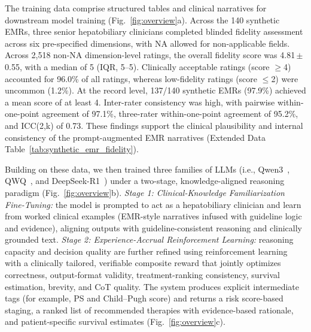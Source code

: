 \documentclass{article}
\begin{document}
The training data comprise structured tables and clinical narratives for downstream model training (Fig.~\ref{fig:overview}a). Across the 140 synthetic EMRs, three senior hepatobiliary clinicians completed blinded fidelity assessment across six pre-specified dimensions, with NA allowed for non-applicable fields. Across 2,518 non-NA dimension-level ratings, the overall fidelity score was 4.81\,$\pm$\,0.55, with a median of 5 (IQR, 5--5). Clinically acceptable ratings (score $\geq$4) accounted for 96.0\% of all ratings, whereas low-fidelity ratings (score $\leq$2) were uncommon (1.2\%). At the record level, 137/140 synthetic EMRs (97.9\%) achieved a mean score of at least 4. Inter-rater consistency was high, with pairwise within-one-point agreement of 97.1\%, three-rater within-one-point agreement of 95.2\%, and ICC(2,k) of 0.73. These findings support the clinical plausibility and internal consistency of the prompt-augmented EMR narratives (Extended Data Table~\ref{tab:synthetic_emr_fidelity}).
 
 
Building on these data, we then trained three families of LLMs (i.e., Qwen3~\cite{qwen3_2025}, QWQ~\cite{qwq32b}, and DeepSeek-R1~\cite{deepseek_r1_2025}) under a two-stage, knowledge-aligned reasoning paradigm (Fig.~\ref{fig:overview}b). \emph{Stage 1: Clinical-Knowledge Familiarization Fine-Tuning:} the model is prompted to act as a hepatobiliary clinician and learn from worked clinical examples (EMR-style narratives infused with guideline logic and evidence), aligning outputs with guideline-consistent reasoning and clinically grounded text. \emph{Stage 2: Experience-Accrual Reinforcement Learning:} reasoning capacity and decision quality are further refined using reinforcement learning with a clinically tailored, verifiable composite reward that jointly optimizes correctness, output-format validity, treatment-ranking consistency, survival estimation, brevity, and CoT quality. The system produces explicit intermediate tags (for example, PS and Child–Pugh score) and returns a risk score-based staging, a ranked list of recommended therapies with evidence-based rationale, and patient-specific survival estimates (Fig.~\ref{fig:overview}c). 
\end{document}
